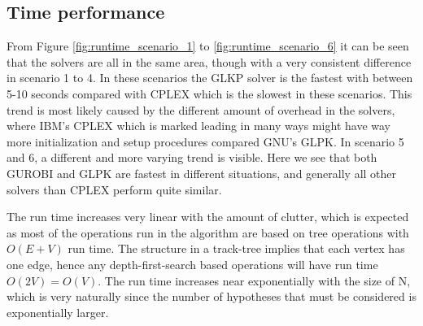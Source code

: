 \subsection{Time performance}
From Figure \ref{fig:runtime_scenario_1} to \ref{fig:runtime_scenario_6} it can be seen that the solvers are all in the same area, though with a very consistent difference in scenario 1 to 4. In these scenarios the GLKP solver is the fastest with between 5-10 seconds compared with CPLEX which is the slowest in these scenarios. This trend is most likely caused by the different amount of overhead in the solvers, where IBM's CPLEX which is marked leading in many ways might have way more initialization and setup procedures compared GNU's GLPK. In scenario 5 and 6, a different and more varying trend is visible. Here we see that both GUROBI and GLPK are fastest in different situations, and generally all other solvers than CPLEX perform quite similar.

The run time increases very linear with the amount of clutter, which is expected as most of the operations run in the algorithm are based on tree operations with $O(E+V)$ run time. The structure in a track-tree implies that each vertex has one edge, hence any depth-first-search based operations will have run time  $O(2V)=O(V)$. The run time increases near exponentially with the size of N, which is very naturally since the number of hypotheses that must be considered is exponentially larger.